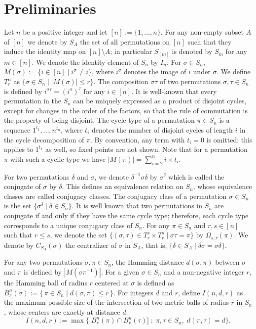 \documentclass{amsart}
\numberwithin{equation}{section}
\begin{document}
\section{Preliminaries}


 Let $n$ be a positive integer and let $[n]:=\{1,\dots, n\}$. For any non-empty subset $A$ of $[n]$ we denote by $S_A$ the set of all permutations on $[n]$ such that they induce the identity map on $[n]\setminus A$; in particular $S_{[m]}$ is denoted by $S_m$ for any $m\in [n]$. We denote the identity element of $S_n$ by $I_n$. For $\sigma \in S_n$, $M(\sigma):=\{i\in [n] \;|\; i^\sigma\neq i\}$, where $i^\sigma$ denotes the image of $i$ under $\sigma$. We define $T_r^n$  as $\{\sigma \in S_n \;|\; |M(\sigma)|\leq r\}$. The composition $\sigma \tau$ of two permutations  $\sigma,\tau \in S_n$ is defined by $i^{\sigma \tau}=(i^\sigma)^\tau$ for any $i\in [n]$.  It is well-known that every permutation in the  \( S_n \) can be uniquely expressed as a product of disjoint cycles, except for changes in the order of the factors, so that the rule of commutation is the property of being disjoint. The cycle type of a permutation \( \pi \in S_n \) is a sequence \(1^{t_1}, \dots , n^{t_n} \),   where $t_i$ denotes the number of disjoint cycles of length $i$ in the cycle decomposition of \( \pi \). By convention, any term with \(t_i = 0\) is omitted; this applies to \(1^{t_1}\) as well, so fixed points are not shown. Note that for a permutation $\pi$ with such a cyclic type we have $|M(\pi)|=\sum_{i=2}^{n}i\times t_i$.
 
 
  For two permutations $\delta$ and $\sigma$, we denote $\delta^{-1} \sigma \delta$ by $\sigma^\delta$  which is called the conjugate of $\sigma$ by $\delta$. This defines an equivalence relation on $S_n$, whose equivalence classes are called conjugacy classes.  
The conjugacy class of a permutation $\sigma \in S_n$ is the set
$
 \{ \sigma^\delta \mid \delta \in S_n \}.
$  It is well known that two permutations in $S_n$ are conjugate if and only if they have the same cycle type; therefore, each cycle type corresponds to a unique conjugacy class of $S_n$.
For any $\pi \in S_n$ and $r,s\in [n]$ such that $r\leq s$, we denote the set $\{(\sigma,\tau)\in T_r^{s} \times T_r^{s} \;|\; \sigma \tau =\pi\}$ by $\Omega_{s,r}(\pi)$. We denote by $C_{S_A}(\sigma)$ the centralizer of $\sigma$ in $S_A$, that is, $\{\delta \in S_A \;|\; \delta \sigma=\sigma \delta\}$.

For any two permutations $\sigma, \pi \in S_n$, the Hamming distance $d(\sigma, \pi)$ between $\sigma$ and $ \pi$  is defined by $|M(\sigma\pi^{-1})|$. For a given $\sigma \in S_n$ and a non-negative integer $r$, the Hamming ball of radius $r$ centered at $\sigma$ is defined as
$
B_r^n(\sigma) := \{\, \pi \in S_n \;|\; d(\sigma,\pi) \le r \,\}.$
For integers $d$ and $r$, define $I(n,d,r)$ as the maximum possible size of the intersection of two metric balls of radius $r$ in $S_n$, whose centers are exactly at distance $d$:
\[
I(n,d,r) := \max \bigl\{ |B_r^n(\pi) \cap B_r^n(\tau)| \; : \; \pi, \tau \in S_n, \; d(\pi,\tau) = d \bigr\}.
\]
\end{document}
